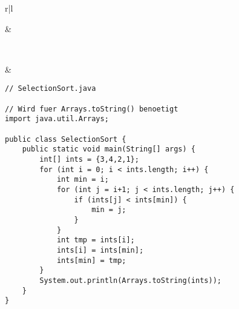 \begin{center}
\begin{tabular}{r|l}
\begin{tikzpicture}
                 nodes={draw, minimum size=8mm},
                 column sep=-\pgflinewidth,
                 column 3/.style={nodes={fill=magenta!25}}] {
        1 & 2 & 3 \\
    };
\end{tikzpicture} &
 \\
 & \\
\end{tabular}
\end{center}

\begin{center}
\begin{lstlisting}
// SelectionSort.java

// Wird fuer Arrays.toString() benoetigt
import java.util.Arrays;

public class SelectionSort {
    public static void main(String[] args) {
        int[] ints = {3,4,2,1};
        for (int i = 0; i < ints.length; i++) {
            int min = i;
            for (int j = i+1; j < ints.length; j++) {
                if (ints[j] < ints[min]) {
                    min = j;
                }
            }
            int tmp = ints[i];
            ints[i] = ints[min];
            ints[min] = tmp;
        }
        System.out.println(Arrays.toString(ints));
    }
}
\end{lstlisting}
\end{center}

